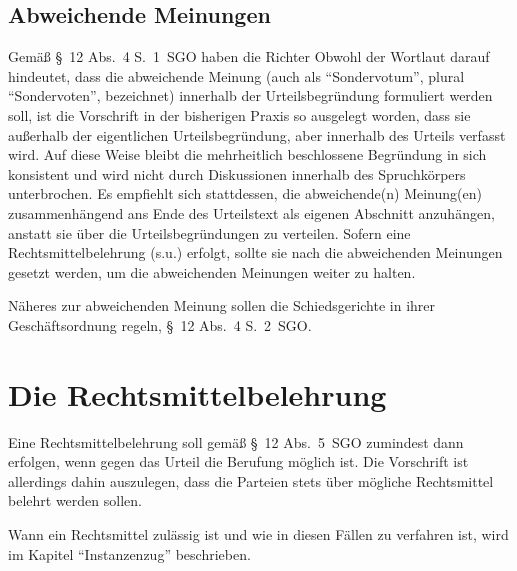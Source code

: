 \subsection{Abweichende Meinungen}
Gemäß \S~12 Abs.~4 S.~1~SGO haben die Richter  Obwohl der Wortlaut darauf hindeutet, dass die abweichende Meinung (auch als \enquote{Sondervotum}, plural \enquote{Sondervoten}, bezeichnet) innerhalb der Urteilsbegründung formuliert werden soll, ist die Vorschrift in der bisherigen Praxis so ausgelegt worden, dass sie außerhalb der eigentlichen Urteilsbegründung, aber innerhalb des Urteils verfasst wird. Auf diese Weise bleibt die mehrheitlich beschlossene Begründung in sich konsistent und wird nicht durch Diskussionen innerhalb des Spruchkörpers unterbrochen. Es empfiehlt sich stattdessen, die abweichende(n) Meinung(en) zusammenhängend ans Ende des Urteilstext als eigenen Abschnitt anzuhängen, anstatt sie über die Urteilsbegründungen zu verteilen. Sofern eine Rechtsmittelbelehrung (s.u.) erfolgt, sollte sie nach die abweichenden Meinungen gesetzt werden, um die abweichenden Meinungen weiter  zu halten.

Näheres zur abweichenden Meinung sollen die Schiedsgerichte in ihrer Geschäftsordnung regeln, \S~12 Abs.~4 S.~2~SGO.

\section{Die Rechtsmittelbelehrung}
Eine Rechtsmittelbelehrung soll gemäß \S~12 Abs.~5~SGO zumindest dann erfolgen, wenn gegen das Urteil die Berufung möglich ist. Die Vorschrift ist allerdings dahin auszulegen, dass die Parteien stets über mögliche Rechtsmittel belehrt werden sollen.

Wann ein Rechtsmittel zulässig ist und wie in diesen Fällen zu verfahren ist, wird im Kapitel \enquote{Instanzenzug} beschrieben.

